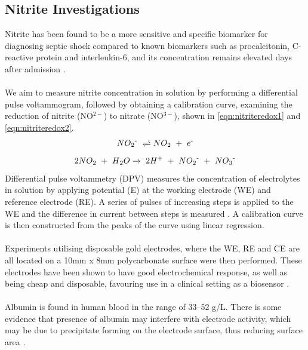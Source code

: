 \subsection{Nitrite Investigations}
Nitrite has been found to be a more sensitive and specific biomarker for diagnosing septic shock compared to known biomarkers such as procalcitonin, C-reactive protein and interleukin-6, and its concentration remains elevated days after admission \cite{pmid9142024}.\\\\
We aim to measure nitrite concentration in solution by performing a differential pulse voltammogram, followed by obtaining a calibration curve, examining the reduction of nitrite (NO$^{2-}$) to nitrate (NO$^{3-}$), shown in \autoref{eqn:nitriteredox1} and \autoref{eqn:nitriteredox2}.
\begin{align} \label{eqn:nitriteredox1}
   NO\textsubscript{2}\textsuperscript{-} \ \xrightleftharpoons{}  NO\textsubscript{2} \ + \  e\textsuperscript{-}
\end{align} 
\begin{align}\label{eqn:nitriteredox2}
  2NO\textsubscript{2} \ + \ H\textsubscript{2}O \xrightarrow{}\  2H\textsuperscript{+} \ + \ NO\textsubscript{2}\textsuperscript{-} \ + \  NO\textsubscript{3}\textsuperscript{-}
\end{align}
Differential pulse voltammetry (DPV) measures the concentration of electrolytes in solution by applying potential (E) at the working electrode (WE) and reference electrode (RE). A series of pulses of increasing steps is applied to the WE and the difference in current between steps is measured \cite{D1CP00661D}. A calibration curve is then constructed from the peaks of the curve using linear regression. \\\\
Experiments utilising disposable gold electrodes, where the WE, RE and CE are all located on a 10mm x 8mm polycarbonate surface were then performed. These electrodes have been shown to have good electrochemical response, as well as being cheap and disposable, favouring use in a clinical setting as a biosensor \cite{FERRARIO201236}.\\\\
Albumin is found in human blood in the range of 33–52 g/L. There is some evidence that presence of albumin may interfere with electrode activity, which may be due to precipitate forming on the electrode surface, thus reducing surface area \cite{doi:10.1177/000456329102800111}.
